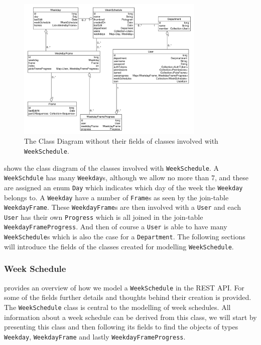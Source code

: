 \begin{figure}
    \centering
        \includegraphics[width=0.8\textwidth]{figures/weekschedulemodel.pdf}
    \caption{The Class Diagram without their fields of classes involved with \texttt{WeekSchedule}.}\label{fig:weekscheduleclassdiagram}
\end{figure}

 shows the class diagram of the classes involved with \texttt{WeekSchedule}.
A \texttt{WeekSchdule} has many \texttt{Weekday}s, although we allow no more than 7, and these are assigned an enum \texttt{Day} which indicates which day of the week the \texttt{Weekday} belongs to.
A \texttt{Weekday} have a number of \texttt{Frame}s as seen by the join-table \texttt{WeekdayFrame}.
These \texttt{WeekdayFrame}s are then involved with a \texttt{User} and each \texttt{User} has their own \texttt{Progress} which is all joined in the join-table \texttt{WeekdayFrameProgress}.
And then of course a \texttt{User} is able to have many \texttt{WeekSchedule}s which is also the case for a \texttt{Department}.
The following sections will introduce the fields of the classes created for modelling \texttt{WeekSchedule}.

\subsubsection{Week Schedule}
 provides an overview of how we model a \texttt{WeekSchedule} in the REST API.
For some of the fields further details and thoughts behind their creation is provided.
The \texttt{WeekSchedule} class is central to the modelling of week schedules.
All information about a week schedule can be derived from this class, we will start by presenting this class and then following its fields to find the objects of types \texttt{Weekday}, \texttt{WeekdayFrame} and lastly \texttt{WeekdayFrameProgress}.

